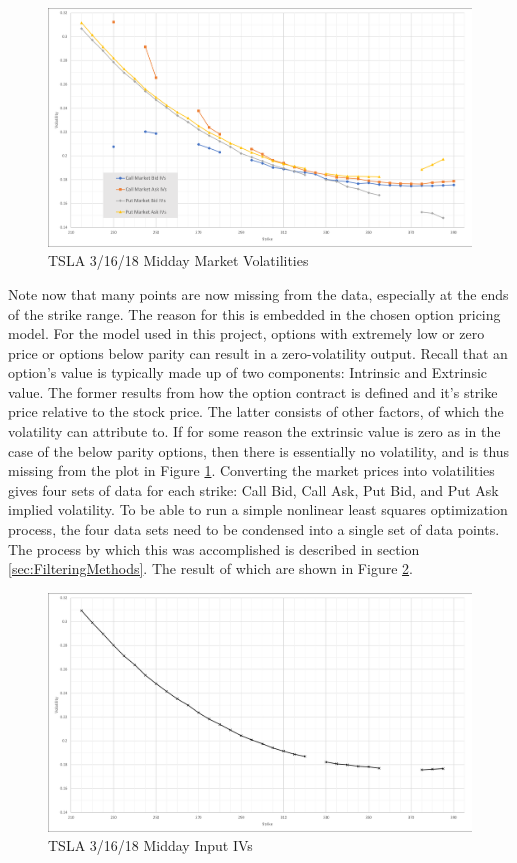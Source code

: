 \documentclass[12pt, a4paper, notitlepage]{article}
\numberwithin{equation}{subsection}
\numberwithin{figure}{subsection}
\numberwithin{table}{subsection}
\newcommand{\newpar}{\newline \newline}
\begin{document}
\begin{figure}[H]
	\caption{TSLA 3/16/18 Midday Market Volatilities}
	\centerline{\includegraphics[width=1\textwidth]{SampleOptionMarketIVs}}
	\label{fig:SampleOptionMarketIVs}
\end{figure}

Note now that many points are now missing from the data, especially at the ends of the strike range.  The reason for this is embedded in the chosen option pricing model.  For the model used in this project, options with extremely low or zero price or options below parity can result in a zero-volatility output.  Recall that an option's value is typically made up of two components:  Intrinsic and Extrinsic value.  The former results from how the option contract is defined and it's strike price relative to the stock price.  The latter consists of other factors, of which the volatility can attribute to.  If for some reason the extrinsic value is zero as in the case of the below parity options, then there is essentially no volatility, and is thus missing from the plot in Figure \ref{fig:SampleOptionMarketIVs}.
\newpar
Converting the market prices into volatilities gives four sets of data for each strike:  Call Bid, Call Ask, Put Bid, and Put Ask implied volatility.  To be able to run a simple nonlinear least squares optimization process, the four data sets need to be condensed into a single set of data points.  The process by which this was accomplished is described in section \ref{sec:FilteringMethods}.  The result of which are shown in Figure \ref{fig:SampleInputIvs}.

\begin{figure}[H]
	\caption{TSLA 3/16/18 Midday Input IVs}
	\centerline{\includegraphics[width=1\textwidth]{SampleInputIvs}}
	\label{fig:SampleInputIvs}
\end{figure}
\end{document}
